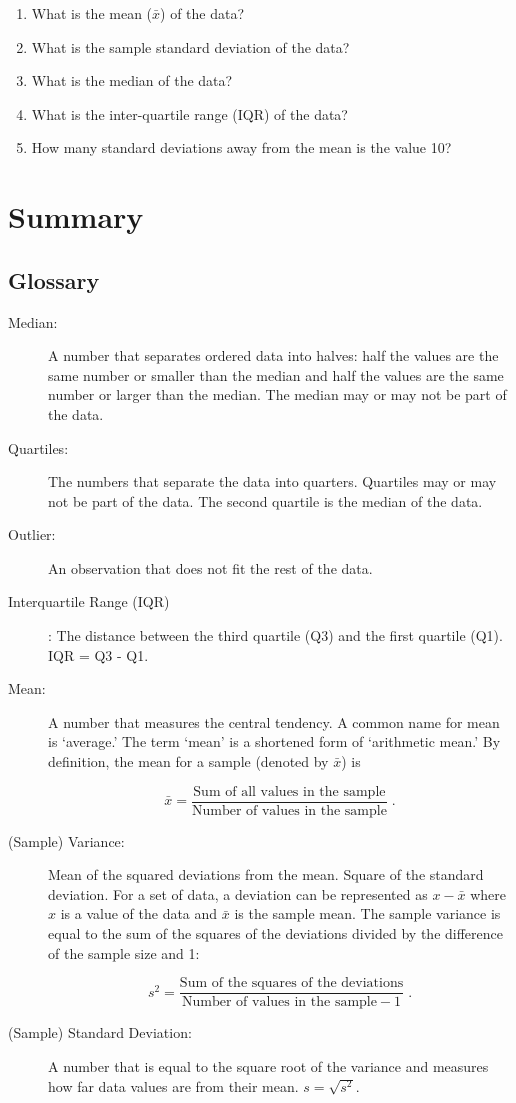 \documentclass[]{krantz}
\theoremstyle{definition}
\theoremstyle{definition}
\theoremstyle{definition}
\theoremstyle{remark}
\begin{document}
\begin{enumerate}
\def\labelenumi{\arabic{enumi}.}
\item
  What is the mean (\(\bar x\)) of the data?
\item
  What is the sample standard deviation of the data?
\item
  What is the median of the data?
\item
  What is the inter-quartile range (IQR) of the data?
\item
  How many standard deviations away from the mean is the value 10?
\end{enumerate}

\hypertarget{summary-2}{%
\section{Summary}\label{summary-2}}

\hypertarget{glossary}{%
\subsection*{Glossary}\label{glossary}}


\begin{description}
\item[Median:]
A number that separates ordered data into halves: half the values
are the same number or smaller than the median and half the values
are the same number or larger than the median. The median may or may
not be part of the data.
\item[Quartiles:]
The numbers that separate the data into quarters. Quartiles may or
may not be part of the data. The second quartile is the median of
the data.
\item[Outlier:]
An observation that does not fit the rest of the data.
\item[Interquartile Range (IQR)]
: The distance between the third quartile (Q3) and the first
quartile (Q1). IQR = Q3 - Q1.
\item[Mean:]
A number that measures the central tendency. A common name for mean
is `average.' The term `mean' is a shortened form of `arithmetic
mean.' By definition, the mean for a sample (denoted by \(\bar x\)) is

\[\bar x = \frac{\mbox{Sum of all values in the sample}}{\mbox{Number of values in the sample}}\;.\]
\item[(Sample) Variance:]
Mean of the squared deviations from the mean. Square of the standard
deviation. For a set of data, a deviation can be represented as
\(x - \bar x\) where \(x\) is a value of the data and \(\bar x\) is the
sample mean. The sample variance is equal to the sum of the squares
of the deviations divided by the difference of the sample size and
1:

\[s^2 = \frac{\mbox{Sum of the squares of the deviations}}{\mbox{Number of values in the sample}-1}\;.\]
\item[(Sample) Standard Deviation:]
A number that is equal to the square root of the variance and
measures how far data values are from their mean. \(s = \sqrt{s^2}\).
\end{description}
\end{document}
